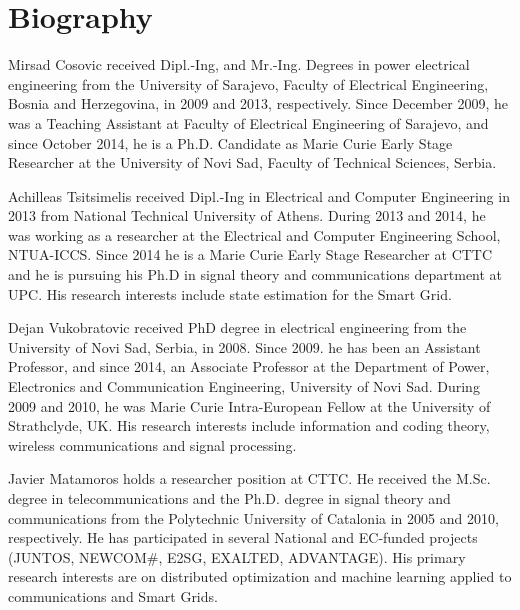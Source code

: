 \documentclass[journal]{IEEEtran}
\begin{document}
\section*{Biography}
\vspace{-1.0cm}
\begin{IEEEbiographynophoto}{Mirsad Cosovic}
received Dipl.-Ing, and Mr.-Ing. Degrees in power electrical engineering from the University of Sarajevo, Faculty of Electrical Engineering, Bosnia and Herzegovina, in 2009 and 2013, respectively. Since December 2009, he was a Teaching Assistant at Faculty of Electrical Engineering of Sarajevo, and since October 2014, he is a Ph.D. Candidate as Marie Curie Early Stage Researcher at the University of Novi Sad, Faculty of Technical Sciences, Serbia.
\end{IEEEbiographynophoto}
\vspace{-0.7cm}
\begin{IEEEbiographynophoto}{Achilleas Tsitsimelis}
received Dipl.-Ing in Electrical and Computer Engineering in 2013 from National Technical University of Athens. During 2013 and 2014, he was working as a researcher at the Electrical and Computer Engineering School, NTUA-ICCS. Since 2014 he is a Marie Curie Early Stage Researcher at CTTC and he is pursuing his Ph.D in signal theory and communications department at UPC. His research interests include state estimation for the Smart Grid.
\end{IEEEbiographynophoto}
\vspace{-0.7cm}
\begin{IEEEbiographynophoto}{Dejan Vukobratovic}
received PhD degree in electrical engineering from the University of Novi Sad, Serbia, in 2008. Since 2009. he has been an Assistant Professor, and since 2014, an Associate Professor at the Department of Power, Electronics and Communication Engineering, University of Novi Sad. During 2009 and 2010, he was Marie Curie Intra-European Fellow at the University of Strathclyde, UK. His research interests include information and coding theory, wireless communications and signal processing.
\end{IEEEbiographynophoto}
\vspace{-0.7cm}
\begin{IEEEbiographynophoto}{Javier Matamoros}
holds a researcher position at CTTC. He received the M.Sc. degree in telecommunications and the Ph.D. degree in signal theory and communications from the Polytechnic University of Catalonia in 2005 and 2010, respectively. He has participated in several National and EC-funded projects (JUNTOS, NEWCOM\#, E2SG, EXALTED, ADVANTAGE). His primary research interests are on distributed optimization and machine learning applied to communications and Smart Grids.
\end{IEEEbiographynophoto}
\end{document}
